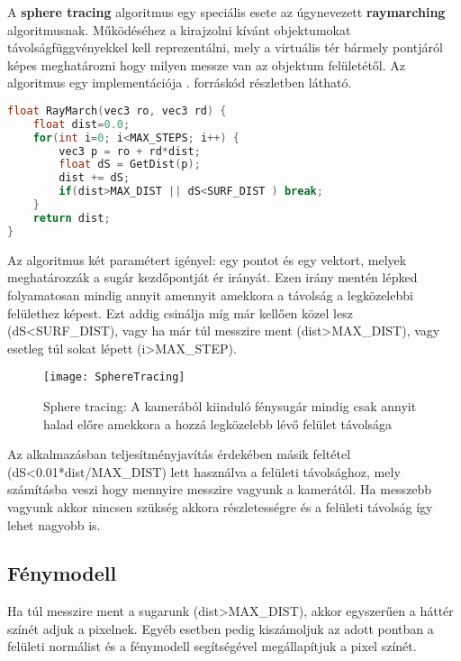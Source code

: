 A \textbf{sphere tracing} algoritmus egy speciális esete az úgynevezett \textbf{raymarching} algoritmusnak. Működéséhez a kirajzolni kívánt objektumokat távolságfüggvényekkel kell reprezentálni, mely a virtuális tér bármely pontjáról képes meghatározni hogy milyen messze van az objektum felületétől. Az algoritmus egy implementációja . forráskód részletben látható.

\begin{lstlisting}[language={C++}]
float RayMarch(vec3 ro, vec3 rd) {
	float dist=0.0;    
    for(int i=0; i<MAX_STEPS; i++) {
    	vec3 p = ro + rd*dist;
        float dS = GetDist(p);
        dist += dS;
        if(dist>MAX_DIST || dS<SURF_DIST ) break;
    }    
    return dist;
}
\end{lstlisting}

Az algoritmus két paramétert igényel: egy pontot és egy vektort, melyek meghatározzák a sugár kezdőpontját ér irányát. Ezen irány mentén lépked folyamatosan mindig annyit amennyit amekkora a távolság a legközelebbi felülethez képest. Ezt addig csinálja míg már kellően közel lesz (dS<SURF\_DIST), vagy ha már túl messzire ment (dist>MAX\_DIST), vagy esetleg túl sokat lépett (i>MAX\_STEP). 


\begin{figure}[H]
	\centering
	\texttt{[image: SphereTracing]}
	\caption{Sphere tracing: A kamerából kiinduló fénysugár mindig csak annyit halad előre amekkora a hozzá legközelebb lévő felület távolsága \cite{Raymarch94:online}}
	\label{fig:SphereTracing2}
\end{figure}

Az alkalmazásban teljesítményjavítás érdekében másik feltétel (dS<0.01*dist/MAX\_DIST) lett használva a felületi távolsághoz, mely számításba veszi hogy mennyire messzire vagyunk a kamerától. Ha messzebb vagyunk akkor nincsen szükség akkora részletességre és a felületi távolság így lehet nagyobb is.

\subsection{Fénymodell}

Ha túl messzire ment a sugarunk (dist>MAX\_DIST), akkor egyszerűen a háttér színét adjuk a pixelnek. Egyéb esetben pedig kiszámoljuk az adott pontban a felületi normálist és a fénymodell segítségével megállapítjuk a pixel színét.

